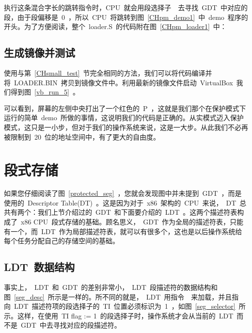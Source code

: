 执行这条混合字长的跳转指令时，CPU~就会用段选择子~~去寻找~GDT~中对应的段，由于段偏移是~0~，所以~CPU~将跳转到图~\ref{CHpm_demo1}~中~demo~程序的开头。为了方便阅读，整个~loader.S~的代码附在图~\ref{CHpm_loader1}~中：

\label{CHpm_loader1}

\subsection{生成镜像并测试}

使用与第~\ref{CHsmall_test}~节完全相同的方法，我们可以将代码编译并将~LOADER.BIN~拷贝到镜像文件中。利用最新的镜像文件启动~VirtualBox~我们得到图~\ref{vb_run_5}~。

可以看到，屏幕的左侧中央打出了一个红色的~P~，这就是我们那个在保护模式下运行的简单~demo~所做的事情，这说明我们的代码是正确的。从实模式迈入保护模式，这只是一小步，但对于我们的操作系统来说，这是一大步。从此我们不必再被限制到~20~位的地址空间中，有了更大的自由度。


\section{段式存储}

如果您仔细阅读了图~\ref{protected_seg}~，您就会发现图中并未提到~GDT~，而是使用的~Descriptor Table(DT)~。这是因为对于~x86~架构的~CPU~来说，~DT~总共有两个：我们上节介绍过的~GDT~和下面要介绍的~LDT~。这两个描述符表构成了~x86 CPU~段式存储的基础。顾名思义，~GDT~作为全局的描述符表，只能有一个，而~LDT~作为局部描述符表，就可以有很多个，这也是以后操作系统给每个任务分配自己的存储空间的基础。

\subsection{LDT~数据结构} \label{CHpm_ldt}


事实上，~LDT~和~GDT~的差别非常小，~LDT~段描述符的数据结构和图~\ref{seg_desc}~所示是一样的。所不同的就是，~LDT~用指令~~来加载，并且指向~LDT~描述符项的段选择子的~TI~位置必须标识为~1~，如图~\ref{seg_selector}~所示。这样，在使用~TI flag := 1~的段选择子时，操作系统才会从当前的~LDT~而不是~GDT~中去寻找对应的段描述符。


